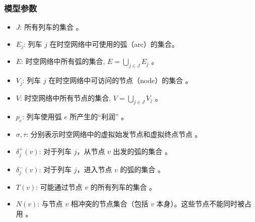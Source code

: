 \documentclass{article}
\begin{document}
\subsubsection{模型参数}
\begin{itemize}
    \item $J$: 所有列车的集合 。
    \item $E_j$: 列车 $j$ 在时空网络中可使用的弧（arc）的集合。
    \item $E$: 时空网络中所有弧的集合, $E = \bigcup_{j \in J} E_j$ 。
    \item $V_j$: 列车 $j$ 在时空网络中可访问的节点（node）的集合 。
    \item $V$: 时空网络中所有节点的集合, $V = \bigcup_{j \in J} V_j$ 。
    \item $p_e$: 列车使用弧 $e$ 所产生的“利润” 。
    \item $\sigma, \tau$: 分别表示时空网络中的虚拟始发节点和虚拟终点节点 。
    \item $\delta_j^+(v)$: 对于列车 $j$，从节点 $v$ 出发的弧的集合 。
    \item $\delta_j^-(v)$: 对于列车 $j$，进入节点 $v$ 的弧的集合 。
    \item $T(v)$: 可能通过节点 $v$ 的所有列车的集合 。
    \item $N(v)$: 与节点 $v$ 相冲突的节点集合（包括 $v$ 本身）。这些节点不能同时被占用 。
\end{itemize}
\end{document}
